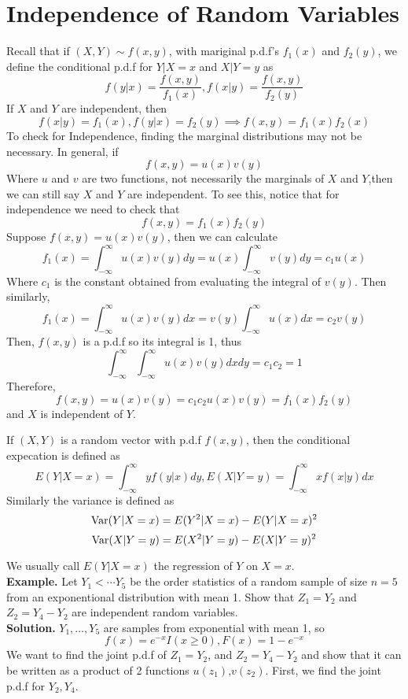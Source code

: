 \documentclass[openany]{report}
\begin{document}
    \section{Independence of Random Variables}
    Recall that if $(X,Y) \sim f(x,y)$, with mariginal p.d.f's $f_1(x)$ and $f_2(y)$, we define the conditional p.d.f for $Y|X = x$ and $X|Y = y$ as 
    \[f(y|x) = \frac{f(x,y)}{f_1(x)}, f(x|y) = \frac{f(x,y)}{f_2(y)}\]
    If $X$ and $Y$ are independent, then 
    \[f(x|y) = f_1(x), f(y|x) = f_2(y) \implies f(x,y) = f_1(x)f_2(x)\]
    To check for Independence, finding the marginal distributions may not be necessary. In general, if 
    \[f(x,y) = u(x)v(y)\]
    Where $u$ and $v$ are two functions, not necessarily the marginals of $X$ and $Y$,then we can still say $X$ and $Y$ are independent. To see this, notice that for independence we need to check that 
    \[f(x,y) = f_1(x)f_2(y)\]
    Suppose $f(x,y) = u(x)v(y)$, then we can calculate 
    \[f_1(x) = \int_{-\infty}^{\infty} u(x)v(y)dy = u(x)\int_{-\infty}^{\infty}v(y)dy = c_1u(x)\]
    Where $c_1$ is the constant obtained from evaluating the integral of $v(y)$. Then similarly,
    \[f_1(x) = \int_{-\infty}^{\infty} u(x)v(y)dx = v(y)\int_{-\infty}^{\infty}u(x)dx = c_2v(y)\]
    Then, $f(x,y)$ is a p.d.f so its integral is 1, thus 
    \[\int_{-\infty}^{\infty}\int_{-\infty}^{\infty}u(x)v(y)dxdy = c_1c_2 = 1\]
    Therefore,
    \[f(x,y) = u(x)v(y) = c_1c_2u(x)v(y) = f_1(x)f_2(y)\]
    and $X$ is independent of $Y$. 
    \begin{definition}
        If $(X,Y)$ is a random vector with p.d.f $f(x,y)$, then the conditional expecation is defined as 
        \[E(Y|X = x) = \int_{-\infty}^{\infty} yf(y|x)dy, E(X|Y = y) = \int_{-\infty}^{\infty} xf(x|y)dx\]
        Similarly the variance is defined as 
        \[\operatorname{Var}(Y|X = x) = E(Y^2|X = x) - E(Y|X = x)^2\]
        \[\operatorname{Var}(X|Y = y) = E(X^2|Y = y) - E(X|Y = y)^2\]
    \end{definition}
    We usually call $E(Y|X=x)$ the regression of $Y$ on $X = x$.\\[2ex]
    \textbf{Example.} Let $Y_1 < \cdots Y_5$ be the order statistics of a random sample of size $n=5$ from an exponentional distribution with mean 1. Show that $Z_1 = Y_2$ and $Z_2 = Y_4 - Y_2$ are independent random variables. \\[2ex]
    \textbf{Solution.} $Y_1,\ldots, Y_5$ are samples from exponential with mean 1, so 
    \[f(x) = e^{-x}I(x \geq 0), F(x) = 1 - e^{-x}\]
    We want to find the joint p.d.f of $Z_1 = Y_2$, and $Z_2 = Y_4-Y_2$ and show that it can be written as a product of 2 functions $u(z_1)$,$v(z_2)$. First, we find the joint p.d.f for $Y_2,Y_4$. 
\end{document}

